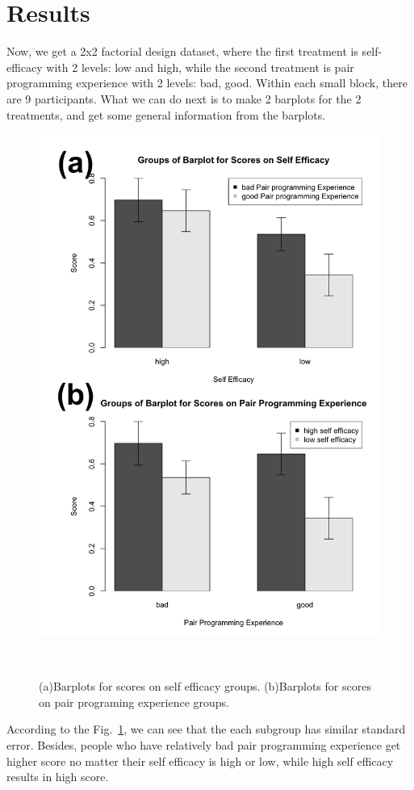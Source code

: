 \documentclass{sigchi}
\begin{document}
\section{Results}

Now, we get a 2x2 factorial design dataset, where the first treatment is self-efficacy with 2 levels: low and high, while the second treatment is pair programming experience with 2 levels: bad, good. Within each small block, there are 9 participants. What we can do next is to make 2 barplots for the 2 treatments, and get some general information from the barplots.

\begin{figure}
\centering
  \includegraphics[width=0.8\columnwidth]{figures/fig3}
  \caption{(a)Barplots for scores on self efficacy groups. (b)Barplots for scores on pair programing experience groups.}~\label{fig:figure3}
\end{figure}

According to the Fig.~\ref{fig:figure3}, we can see that the each subgroup has similar standard error. Besides, people who have relatively bad pair programming experience get higher score no matter their self efficacy is high or low, while high self efficacy results in high score. 
\end{document}

